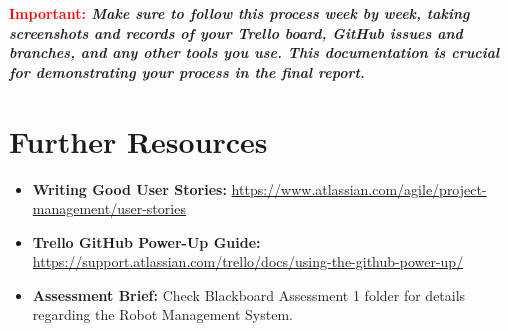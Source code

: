 \documentclass[a4paper,12pt]{article}
\begin{document}
\vspace{0.5cm}
\noindent \textbf{\textcolor{red}{Important:} \textit{Make sure to follow this process week by week, taking screenshots and records of your Trello board, GitHub issues and branches, and any other tools you use. This documentation is crucial for demonstrating your process in the final report.}}


\section*{Further Resources}

\begin{itemize}
    \item \textbf{Writing Good User Stories:} \href{https://www.atlassian.com/agile/project-management/user-stories}{https://www.atlassian.com/agile/project-management/user-stories}
    \item \textbf{Trello GitHub Power-Up Guide:} \href{https://support.atlassian.com/trello/docs/using-the-github-power-up/}{https://support.atlassian.com/trello/docs/using-the-github-power-up/}
    \item \textbf{Assessment Brief:} Check Blackboard Assessment 1 folder for details regarding the Robot Management System.
\end{itemize}
\end{document}
